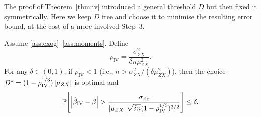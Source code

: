 The proof of Theorem~\ref{thm:iv} introduced a general threshold $D$ but then
fixed it symmetrically. Here we keep $D$ free and choose it to minimise the
resulting error bound, at the cost of a more involved Step~3.

\begin{theorem}
\label{thm:iv_opt}
    Assume \ref{ass:exog}--\ref{ass:moments}. Define
    \[
        \rho_\mathrm{IV} = \frac{\sigma_{ZX}^2}{\delta n\mu_{ZX}^2}.
    \]
    For any $\delta\in(0,1)$, if $\rho_\mathrm{IV} < 1$ (i.e., $n > \sigma_{ZX}^2/(\delta\mu_{ZX}^2)$),
    then the choice $D^* = (1-\rho_\mathrm{IV}^{1/3})\left|\mu_{ZX}\right|$ is optimal and
    \begin{equation}
    \label{eq:iv_bound_opt}
        \operatorname{\mathbb{P}}\!\left[\left|\hat{\beta}_{\mathrm{IV}} - \beta\right| > \frac{\sigma_{Z\varepsilon}}{\left|\mu_{ZX}\right|\sqrt{\delta n}(1-\rho_\mathrm{IV}^{1/3})^{3/2}} \right] \leq \delta.
    \end{equation}
\end{theorem}

